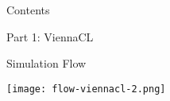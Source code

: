 

\begin{frame}{Contents}
  \begin{center}
   \Large Part 1: ViennaCL
  \end{center}
\end{frame}

\begin{frame}{Simulation Flow}
  \begin{center}
   \texttt{[image: flow-viennacl-2.png]}
  \end{center}
\end{frame}












